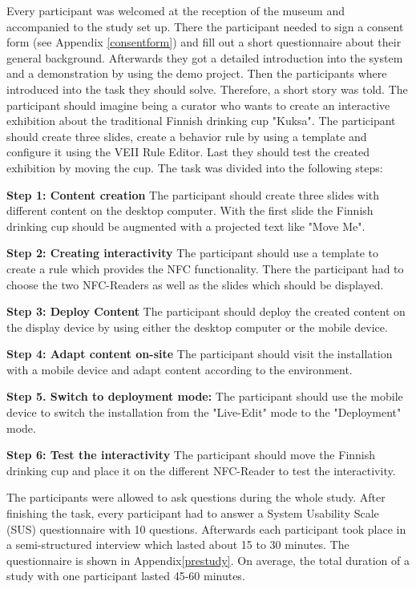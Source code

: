 Every participant was welcomed at the reception of the museum and accompanied to the study set up. There the participant needed to sign a consent form (see Appendix \ref{consentform}) and fill out a short questionnaire about their general background. Afterwards they got a detailed introduction into the system and a demonstration by using the demo project. Then the participants where introduced into the task they should solve. Therefore, a short story was told. The participant should imagine being a curator who wants to create an interactive exhibition about the traditional Finnish drinking cup "Kuksa". The participant should create three slides, create a behavior rule by using a template and configure it using the VEII Rule Editor. Last they should test the created exhibition by moving the cup. The task was divided into the following steps:

\textbf{Step 1: Content creation}
\newline
The participant should create three slides with different content on the desktop computer. With the first slide the Finnish drinking cup should be augmented with a projected text like "Move Me".

\textbf{Step 2: Creating interactivity} 
\newline
The participant should use a template to create a rule which provides the NFC functionality. There the participant had to choose the two NFC-Readers as well as the slides which should be displayed.

\textbf{Step 3: Deploy Content} 
\newline
The participant should deploy the created content on the display device by using either the desktop computer or the mobile device.

\textbf{Step 4: Adapt content on-site} 
\newline
The participant should visit the installation with a mobile device and adapt content according to the environment.

\textbf{Step 5. Switch to deployment mode:} 
\newline
The participant should use the mobile device to switch the installation from the "Live-Edit" mode to the "Deployment" mode.

\textbf{Step 6: Test the interactivity} 
\newline
The participant should move the Finnish drinking cup and place it on the different NFC-Reader to test the interactivity.

The participants were allowed to ask questions during the whole study. After finishing the task, every participant had to answer a System Usability Scale (SUS) questionnaire with 10 questions. Afterwards each participant took place in a semi-structured interview which lasted about 15 to 30 minutes. The questionnaire is shown in Appendix\ref{prestudy}. On average, the total duration of a study with one participant lasted 45-60 minutes.

